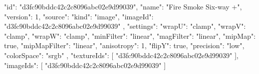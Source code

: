 {
  "id": "d3fc90bddc42c2c8096abc02e9d99039",
  "name": "Fire Smoke Six-way +",
  "version": 1,
  "source": {
    "kind": "image",
    "imageId": "d3fc90bddc42c2c8096abc02e9d99039"
  },
  "settings": {
    "wrapU": "clamp",
    "wrapV": "clamp",
    "wrapW": "clamp",
    "minFilter": "linear",
    "magFilter": "linear",
    "mipMap": true,
    "mipMapFilter": "linear",
    "anisotropy": 1,
    "flipY": true,
    "precision": "low",
    "colorSpace": "srgb"
  },
  "textureIds": [
    "d3fc90bddc42c2c8096abc02e9d99039"
  ],
  "imageIds": [
    "d3fc90bddc42c2c8096abc02e9d99039"
  ]
}
